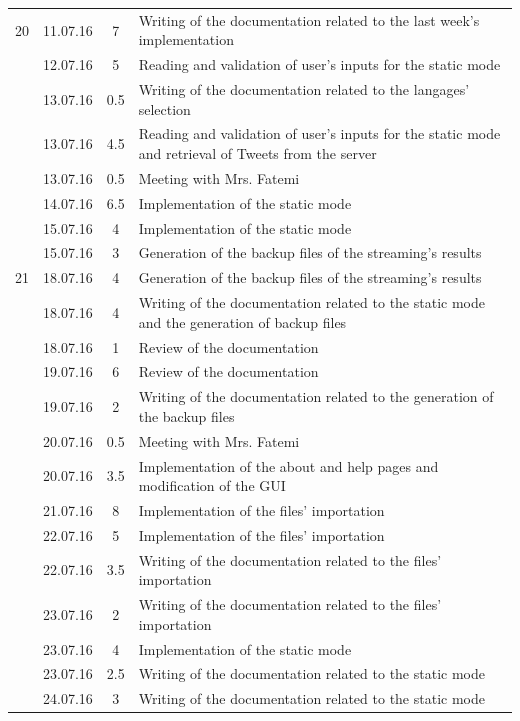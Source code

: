 \documentclass[a4paper,11pt]{report}
\begin{document}
\begin{center}
\begin{longtable}{c|l|c|p{10cm}}
    20 & 11.07.16 & 7 & Writing of the documentation related to the last week's implementation\\
     & 12.07.16 & 5 & Reading and validation of user's inputs for the static mode\\
     & 13.07.16 & 0.5 & Writing of the documentation related to the langages' selection\\
     & 13.07.16 & 4.5 & Reading and validation of user's inputs for the static mode and retrieval of Tweets from the server\\
     & 13.07.16 & 0.5 & Meeting with Mrs. Fatemi\\
     & 14.07.16 & 6.5 & Implementation of the static mode\\
     & 15.07.16 & 4 & Implementation of the static mode\\
     & 15.07.16 & 3 & Generation of the backup files of the streaming's results\\\hline
    21 & 18.07.16 & 4 & Generation of the backup files of the streaming's results\\
     & 18.07.16 & 4 & Writing of the documentation related to the static mode and the generation of backup files\\
     & 18.07.16 & 1 & Review of the documentation\\
     & 19.07.16 & 6 & Review of the documentation\\
     & 19.07.16 & 2 & Writing of the documentation related to the generation of the backup files\\
     & 20.07.16 & 0.5 & Meeting with Mrs. Fatemi\\
     & 20.07.16 & 3.5 & Implementation of the about and help pages and modification of the GUI\\
     & 21.07.16 & 8 & Implementation of the files' importation\\
     & 22.07.16 & 5 & Implementation of the files' importation\\
     & 22.07.16 & 3.5 & Writing of the documentation related to the files' importation\\
     & 23.07.16 & 2 & Writing of the documentation related to the files' importation\\
     & 23.07.16 & 4 & Implementation of the static mode\\
     & 23.07.16 & 2.5 & Writing of the documentation related to the static mode\\
     & 24.07.16 & 3 & Writing of the documentation related to the static mode\\

\end{longtable}
\end{center}
\end{document}
